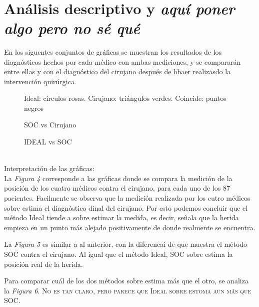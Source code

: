 \documentclass{article}
\begin{document}
	 
	 
	
	\ \\
	
	
	
	
	
	
\section{Análisis descriptivo y \textit{aquí poner algo pero no sé qué}}
	En los siguentes conjuntos de gráficas se muestran los resultados de los diagnósticos hechos por cada médico con ambas mediciones, y se compararán entre ellas y con el diagnóstico del cirujano después de hbaer realizasdo la intervención quirúrgica. 
	
	\begin{figure}[h!tb]
		\centerline{}
		\caption{\label{fig:prueba} Ideal: círculos rosas. Cirujano: triángulos verdes. Coincide: puntos negros}  %
	\end{figure}			

	\begin{figure}[h!tb]
		\centerline{}
		\caption{\label{fig:prueba} SOC vs Cirujano}
	\end{figure}
	
	\begin{figure}[h!tb]
		\centerline{}
		\caption{\label{fig:prueba} IDEAL vs SOC}
	\end{figure}
	
	\ \\
	Interpretación de las gráficas: \ \\
	La \textit{Figura 4} corresponde a las gráficas donde se compara la medición de la posición de los cuatro médicos contra el cirujano, para cada uno de los 87 pacientes. Facilmente se observa que la medición realizada por los cutro médicos sobre estima el diagnóstico dinal del cirujano. Por esto podemos concluir que el método Ideal tiende a sobre estimar la medida, es decir, señala que la herida empieza en un punto más alejado positivamente de donde realmente se encuentra.
	
	La \textit{Figura 5} es similar a al anterior, con la diferencai de que muestra el método SOC contra el cirujano. Al igual que el método Ideal, SOC sobre estima la posición real de la herida.
	
	Para comparar cuál de los dos métodos sobre estima más que el otro, se analiza la \textit{Figura 6}. \textsc{No es tan claro, pero parece que Ideal sobre estoma aún más que SOC.}
	
	
\end{document}
